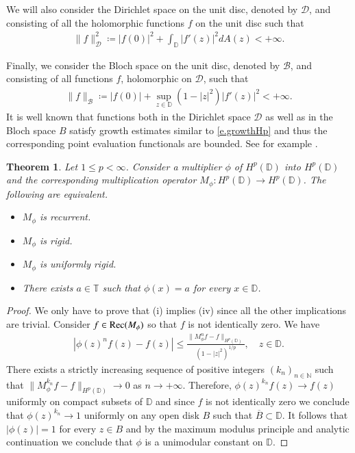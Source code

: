 \documentclass[12pt,leqno]{amsart}
\theoremstyle{plain}
\newtheorem{theorem}[equation]{Theorem}
\theoremstyle{definition}
\numberwithin{equation}{section}
\begin{document}
We will also consider the Dirichlet space on the unit disc, denoted by $\mathcal D$, and consisting of all the holomorphic functions $f$ on the unit disc such that 
\begin{align*}
	\|f\|_{\mathcal D} ^2 \coloneqq |f(0)|^2 +\int_{\mathbb D} |f'(z)|^2 dA(z)<+\infty. 
\end{align*}

Finally, we consider the Bloch space on the unit disc, denoted by $\mathcal B$, and consisting of all functions $f$, holomorphic on $\mathcal D$, such that 
\begin{align*}
	\|f\|_{\mathcal B}\coloneqq |f(0)|+\sup_{z\in\mathbb D} (1-|z|^2)|f'(z)|^2<+\infty. 
\end{align*}
It is well known that functions both in the Dirichlet space $\mathcal D$ as well as in the Bloch space $B$ satisfy growth estimates similar to \eqref{e.growthHp} and thus the corresponding point evaluation functionals are bounded. See for example \cite{ADMV}.

\begin{theorem}
	Let $1\leq p<\infty$. Consider a multiplier $\phi$ of $H^p(\mathbb D)$ into $H^p(\mathbb D)$ and the corresponding multiplication operator $M_{\phi}:H^p(\mathbb D)\to H^p(\mathbb D)$. The following are equivalent. 
	\begin{itemize}
		\item[(i)] $M_\phi $ is recurrent. 
		\item[(ii)] $M_\phi$ is rigid. 
		\item[(iii)] $M_\phi$ is uniformly rigid. 
		\item [(iv)] There exists $a\in \mathbb T$ such that $\phi (x)=a$ for every $x\in \mathbb D$. 
	\end{itemize}
\end{theorem}

\begin{proof}
	We only have to prove that (i) implies (iv) since all the other implications are trivial. Consider $f\in {\textnormal{Rec}}(M_{\phi })$ so that $f$ is not identically zero. We have 
	\begin{align*}
		|\phi (z)^{n}f(z)-f(z)|\leq \frac{ \| M_{\phi }^nf-f\|_{H^p(\mathbb D)} }{(1-|z|^2)^{1/p}}, \quad z\in \mathbb D . 
	\end{align*}
	There exists a strictly increasing sequence of positive integers $(k_n)_{n\in\mathbb N}$ such that $\|M_\phi ^{k_n}f-f\|_{H^p(\mathbb D)} \to 0$ as $n\to+\infty$. Therefore, $\phi (z)^{k_n}f(z)\to f(z)$ uniformly on compact subsets of $\mathbb D$ and since $f$ is not identically zero we conclude that $\phi (z)^{k_n}\to 1$ uniformly on any open disk $B$ such that $\overline{B} \subset \mathbb D$. It follows that $|\phi (z) |=1$ for every $z\in B$ and by the maximum modulus principle and analytic continuation we conclude that $\phi $ is a unimodular constant on $\mathbb D$. 
\end{proof}
\end{document}
